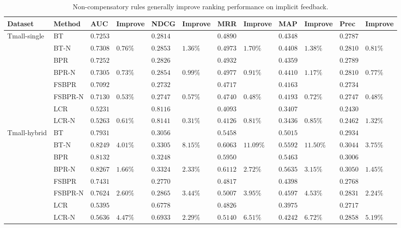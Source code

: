 \documentclass[letterpaper]{article} %
\begin{document}
\begin{table}[ht]
\tiny
\caption{Non-compensatory rules generally improve ranking performance on implicit feedback.}
\begin{center}
\begin{tabular}{p{1.2cm}<{\centering}|p{1.2cm}<{\centering} |p{0.5cm} p{0.6cm} |p{0.5cm} p{0.6cm} |p{0.5cm} p{0.6cm}|p{0.5cm} p{0.6cm} |p{0.5cm} p{0.6cm}}
\hline
Dataset	& Method	& AUC	& Improve&	NDCG&	Improve&	MRR	&Improve &	MAP&	Improve&	Prec	&Improve\\\hline
\multirow{6}{*}{Tmall-single} &	BT	& $0.7253 $&  &$0.2814$& &$0.4890$&   &$0.4348$& 	& $0.2787$ 	&\\
	&BT-N	&$0.7308$ &	$0.76\%$	&$0.2853 $	&$1.36\%$	&$0.4973$ &	$1.70\%$	&$0.4408$ &	$1.38\%$	&$0.2810 $	&$0.81\%$\\
	&BPR&	$0.7252$ 	&&	$0.2826$ 	&&	$0.4932$ & &$0.4359$& 	& $0.2789$ 	&\\
	&BPR-N	&$0.7305$ 	&$0.73\%$	&$0.2854$ &	$0.99\%$	&$0.4977$ 	&$0.91\%$ &$0.4410$ &	$1.17\%$	&$0.2810 $	&$0.77\%$	\\
	&FSBPR		&$0.7092$&	&$0.2732$ 	&&	$0.4717$& &$0.4163$& 	& $0.2734$ 	&\\	
	&FSBPR-N	&$0.7130$	&$0.53\%$	&	$0.2747$ 	&$0.57\%$	&$0.4740$ 	&$0.48\%$ &$0.4193$ &	$0.72\%$	&$0.2747 $	&$0.48\%$	\\
	&LCR		&$0.5231 $&	&$0.8116 $ 	&&	$0.4093 $& &$0.3407 $& 	& $0.2430 $ 	&\\	
	&LCR-N	&$0.5263 $	&$0.61\%$	&	$0.8141$ 	&$0.31\%$	&$0.4126$ 	&$0.81\%$ &$0.3436$ &	$0.85\%$	&$0.2462 $	&$1.32\%$\\

	\hline
\multirow{6}{*}{Tmall-hybrid}	&	BT	& $0.7931 $&  &$0.3056$& &$0.5458$&   &$0.5015$& 	& $0.2934$ 	&\\
	&BT-N	&$0.8249$ &	$4.01\%$	&$0.3305 $	&$8.15\%$	&$0.6063$ &	$11.09\%$	&$0.5592$ &	$11.50\%$	&$0.3044 $	&$3.75\%$\\
	&BPR&	$0.8132$ 	&&	$0.3248$ 	&&	$0.5950$ & &$0.5463$& 	& $0.3006$ 	&\\
	&BPR-N	&$0.8267$ 	&$1.66\%$	&$0.3324$ &	$2.33\%$	&$0.6112$ 	&$2.72\%$ &$0.5635$ &	$3.15\%$	&$0.3050 $	&$1.45\%$	\\
	&FSBPR		&$0.7431$&	&$0.2770$ 	&&	$0.4817$& &$0.4398$& 	& $0.2768$ 	&\\	
	&FSBPR-N	&$0.7624$	&$2.60\%$	&	$0.2865$ 	&$3.44\%$	&$0.5007$ 	&$3.95\%$ &$0.4597$ &	$4.53\%$	&$0.2831 $	&$2.24\%$	\\
	&LCR		&$0.5395$&	&$0.6778$ 	&&	$0.4826$& &$0.3975$& 	& $0.2717$ 	&\\	
	&LCR-N	&$0.5636$	&$4.47\%$	&	$0.6933$ 	&$2.29\%$	&$0.5140$ 	&$6.51\%$ &$0.4242$ &	$6.72\%$	&$0.2858 $	&$5.19\%$\\


\end{tabular}
\end{center}
\end{table}
\end{document}
